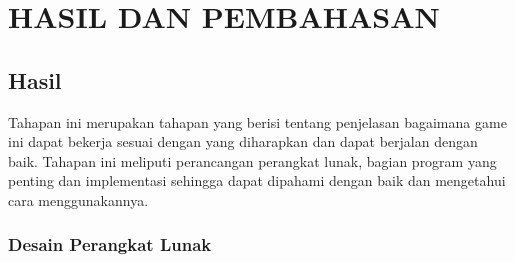 \chapter{HASIL DAN PEMBAHASAN}
\section{Hasil}
\noindent

Tahapan ini merupakan tahapan yang berisi tentang penjelasan bagaimana game ini dapat bekerja sesuai dengan yang diharapkan dan dapat berjalan dengan baik. Tahapan ini meliputi perancangan perangkat lunak, bagian program yang penting dan implementasi sehingga dapat dipahami dengan baik dan mengetahui cara menggunakannya.

\subsection{Desain Perangkat Lunak}

